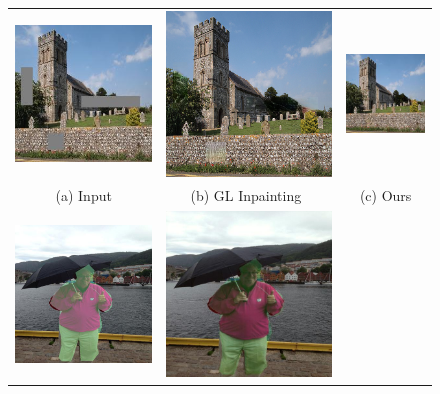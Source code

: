 \begin{figure}[t]
\centering
\setlength\tabcolsep{1pt}
\begin{tabular}{ccc}
  \includegraphics[width=.34\textwidth]{figures/teaser/000000120572_input_image.jpg}&
  \includegraphics[width=.34\textwidth]{figures/teaser/output_mask17.png}&
  \includegraphics[width=.34\textwidth]{figures/teaser/000000120572_synthesized_image.jpg} \\
  (a) Input  & (b) GL Inpainting~\cite{iizuka2017globally} & (c) Ours  \\
  \includegraphics[width=.34\textwidth]{figures/teaser/input.jpg}&
  \includegraphics[width=.34\textwidth]{figures/teaser/dh.jpg}&

\end{tabular}
\end{figure}
